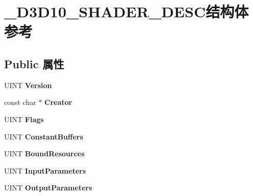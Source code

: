 \hypertarget{struct___d3_d10___s_h_a_d_e_r___d_e_s_c}{}\section{\+\_\+\+D3\+D10\+\_\+\+S\+H\+A\+D\+E\+R\+\_\+\+D\+E\+S\+C结构体 参考}
\label{struct___d3_d10___s_h_a_d_e_r___d_e_s_c}
\subsection*{Public 属性}
\begin{DoxyCompactItemize}
\item 
\mbox{\label{struct___d3_d10___s_h_a_d_e_r___d_e_s_c_a5c66cd58c839c768505e9d562341059b}} 
U\+I\+NT {\bfseries Version}
\item 
\mbox{\label{struct___d3_d10___s_h_a_d_e_r___d_e_s_c_adc806814cf8c43dbac5e86bd7eb6d021}} 
const char $\ast$ {\bfseries Creator}
\item 
\mbox{\label{struct___d3_d10___s_h_a_d_e_r___d_e_s_c_a45270ee526337c5b4433ecc551eb5a0c}} 
U\+I\+NT {\bfseries Flags}
\item 
\mbox{\label{struct___d3_d10___s_h_a_d_e_r___d_e_s_c_a4fb30916762b425840f50d5df3752ccd}} 
U\+I\+NT {\bfseries Constant\+Buffers}
\item 
\mbox{\label{struct___d3_d10___s_h_a_d_e_r___d_e_s_c_a83ebb76c707601c61a19c585ab2a8832}} 
U\+I\+NT {\bfseries Bound\+Resources}
\item 
\mbox{\label{struct___d3_d10___s_h_a_d_e_r___d_e_s_c_a92d2160f8553c3c40ec06684065135cd}} 
U\+I\+NT {\bfseries Input\+Parameters}
\item 
\mbox{\label{struct___d3_d10___s_h_a_d_e_r___d_e_s_c_a0a7af87aeb06d7e2b31540f4db885236}} 
U\+I\+NT {\bfseries Output\+Parameters}
\item 
\mbox{\label{struct___d3_d10___s_h_a_d_e_r___d_e_s_c_a6badb11e4fdc6a9a88710326b12d2eca}} 

\end{DoxyCompactItemize}
